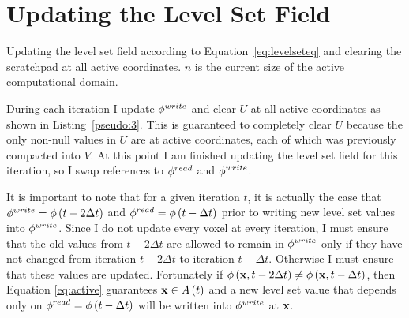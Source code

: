\section{Updating the Level Set Field}
\label{subsec:updatingTheLevelSetField}


\begin{Listing}[t]
    \caption{Updating the level set field according to Equation~\ref{eq:levelseteq} and clearing the scratchpad at all active coordinates. $n$ is the current size of the active computational domain. \label{pseudo:3} }
    \begin{algorithmic}[1]
        \ENDFOR
    \end{algorithmic}
\end{Listing}



During each iteration I update $\phi^{write}$ and clear $U$ at all active coordinates as shown in Listing~\ref{pseudo:3}. This is guaranteed to completely clear $U$ because the only non-null values in $U$ are at active coordinates, each of which was previously compacted into $V$. At this point I am finished updating the level set field for this iteration, so I swap references to $\phi^{read}$ and $\phi^{write}$.

It is important to note that for a given iteration $t$, it is actually the case that $\phi^{write} = \phi \left( t - 2 \Delta t \right) $ and $ \phi^{read} = \phi \left( t - \Delta t \right) $ prior to writing new level set values into $\phi^{write}$. Since I do not update every voxel at every iteration, I must ensure that the old values from $t - 2 \Delta t$ are allowed to remain in $ \phi^{write} $ only if they have not changed from iteration $t - 2 \Delta t$ to iteration $t - \Delta t$. Otherwise I must ensure that these values are updated. Fortunately if $\mathit{\phi} \left( {\mathbf x} , t - 2 \Delta t \right) \neq \mathit{\phi} \left( {\mathbf x} , t - \Delta t \right) $, then Equation \ref{eq:active} guarantees $ {\mathbf x} \in A \left( t \right) $ and a new level set value that depends only on $ \phi^{read} = \phi \left( t - \Delta t \right) $ will be written into $ \phi^{write} $ at $ {\mathbf x} $.



